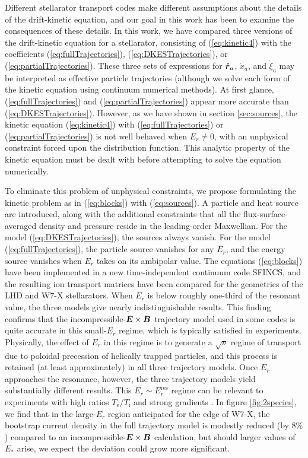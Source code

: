 \documentclass[12pt]{revtex4}
\newcommand{\vect}[1]{\mbox{\boldmath $#1$}}
\newcommand{\Ti}{T_{\mathrm{i}}}
\newcommand{\Te}{T_{\mathrm{e}}}
\newcommand{\Erres}{E_r^{\mathrm{res}}}
\begin{document}
Different stellarator transport codes make different assumptions about the
details of the drift-kinetic equation, and our goal in this work has been
to examine the consequences of these details.
In this work, we have compared three versions of the drift-kinetic equation
for a stellarator, consisting of (\ref{eq:kinetic4}) with
the coefficients (\ref{eq:fullTrajectories}), (\ref{eq:DKESTrajectories}),
or (\ref{eq:partialTrajectories}).
These three sets of expressions for $\vect{\dot{r}}_a$,
$\dot{x}_a$, and $\dot{\xi}_a$ may be interpreted as effective
particle trajectories (although we solve each form of the kinetic equation
using continuum numerical methods).
At first glance,  (\ref{eq:fullTrajectories}) and  (\ref{eq:partialTrajectories})
appear more accurate than  (\ref{eq:DKESTrajectories}).
However, as we have shown in section \ref{sec:sources},
the kinetic equation (\ref{eq:kinetic4})
with  (\ref{eq:fullTrajectories}) or  (\ref{eq:partialTrajectories})
is not well behaved when $E_r \ne 0$,
with an unphysical constraint forced upon the distribution function.
This analytic property of the kinetic equation must be dealt with
before attempting to solve the equation numerically.

To eliminate this problem of unphysical constraints,
we propose formulating the kinetic problem as in  (\ref{eq:blocks}) with (\ref{eq:sources}).
A particle and heat source are introduced,
along with the additional constraints that all the flux-surface-averaged
density and pressure reside in the leading-order Maxwellian.
For the model (\ref{eq:DKESTrajectories}), the sources always vanish.
For the model  (\ref{eq:fullTrajectories}), the particle source
vanishes for any $E_r$, and the energy source vanishes when $E_r$
takes on its ambipolar value.
The equations (\ref{eq:blocks}) have been implemented in a new time-independent continuum code SFINCS,
and the resulting ion transport matrices have been compared for the geometries of the LHD and W7-X stellarators.
When $E_r$ is below roughly one-third of the resonant value,
the three models give nearly indistinguishable results. 
This finding confirms that the incompressible-$\vect{E}\times\vect{B}$ trajectory
model used in some codes \cite{DKES1,DKES2} is quite accurate in this
small-$E_r$ regime, which is typically satisfied in experiments.
Physically, the effect of $E_r$ in this regime is to generate a $\sqrt{\nu}$ regime
of transport due to poloidal precession of helically trapped particles,
and this process is retained (at least approximately) in all three trajectory models.
Once $E_r$ approaches the resonance, however, the three trajectory models
yield substantially different results.
This $E_r \sim \Erres$ regime can be relevant to experiments with high ratios $\Te / \Ti$
\cite{Lore, Briesemeister} and strong gradients \cite{Baldzuhn}.
In figure \ref{fig:2species}, we find that in the large-$E_r$ region anticipated for the edge of W7-X,
the bootstrap current density in the full trajectory model is modestly reduced (by $8\%$)
compared to an incompressible-$\vect{E}\times\vect{B}$ calculation,
but should larger values of $E_*$ arise, we expect the deviation could grow more significant.
\end{document}
